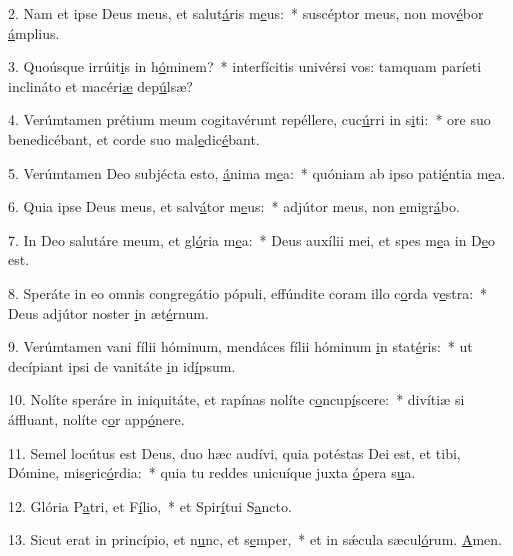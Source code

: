 2. Nam et ipse Deus meus, et salut\uline{á}ris m\uline{e}us:~* suscéptor meus, non mov\uline{é}bor \uline{á}mplius.\par 
3. Quoúsque irrúit\uline{i}s in h\uline{ó}minem?~* interfícitis univérsi vos: tamquam paríeti inclináto et macéri\uline{æ} dep\uline{ú}lsæ?\par 
4. Verúmtamen prétium meum cogitavérunt repéllere, cuc\uline{ú}rri in s\uline{i}ti:~* ore suo benedicébant, et corde suo mal\uline{e}dic\uline{é}bant.\par 
5. Verúmtamen Deo subjécta esto, \uline{á}nima m\uline{e}a:~* quóniam ab ipso pati\uline{é}ntia m\uline{e}a.\par 
6. Quia ipse Deus meus, et salv\uline{á}tor m\uline{e}us:~* adjútor meus, non \uline{e}migr\uline{á}bo.\par 
7. In Deo salutáre meum, et gl\uline{ó}ria m\uline{e}a:~* Deus auxílii mei, et spes m\uline{e}a in D\uline{e}o est.\par 
8. Speráte in eo omnis congregátio pópuli, effúndite coram illo c\uline{o}rda v\uline{e}stra:~* Deus adjútor noster \uline{i}n æt\uline{é}rnum.\par 
9. Verúmtamen vani fílii hóminum, mendáces fílii hóminum \uline{i}n stat\uline{é}ris:~* ut decípiant ipsi de vanitáte \uline{i}n id\uline{í}psum.\par 
10. Nolíte speráre in iniquitáte, et rapínas nolíte c\uline{o}ncup\uline{í}scere:~* divítiæ si áffluant, nolíte c\uline{o}r app\uline{ó}nere.\par 
11. Semel locútus est Deus, duo hæc audívi, quia potéstas Dei est, et tibi, Dómine, mis\uline{e}ric\uline{ó}rdia:~* quia tu reddes unicuíque juxta \uline{ó}pera s\uline{u}a.\par 
12. Glória P\uline{a}tri, et F\uline{í}lio,~* et Spir\uline{í}tui S\uline{a}ncto.\par 
13. Sicut erat in princípio, et n\uline{u}nc, et s\uline{e}mper,~* et in sǽcula sæcul\uline{ó}rum. \uline{A}men.\par 
